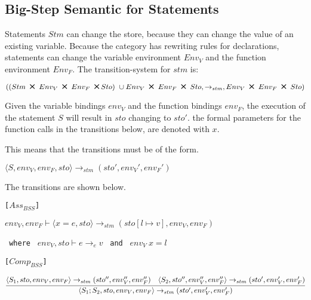 \subsection{Big-Step Semantic for Statements}
Statements $Stm$ can change the store, because they can change the value of an existing variable.
Because the category has rewriting rules for declarations, statements can change the variable environment $Env_V$ and the function environment $Env_F$.
The transition-system for $stm$ is:
\begin{center}
	$((Stm\ \Cross\ Env_V\ \Cross\ Env_F\ \Cross Sto)\ \cup Env_V\ \Cross\ Env_F\ \Cross\ Sto, \rightarrow_{stm}, Env_V\ \Cross\ Env_F\ \Cross\ Sto)$
\end{center}
Given the variable bindings $env_V$ and the function bindings $env_F$, the execution of the statement $S$ will 
result in $sto$ changing to $sto'$.
the formal parameters for the function calls in the transitions below, are denoted with $x$.

This means that the transitions must be of the form.

\begin{center}
	\begin{math}
		{\langle S, env_V, env_F, sto \rangle \rightarrow_{stm} (sto', env_V', env_F')}
	\end{math}
\end{center}

The transitions are shown below.

\texttt{[$Ass_{BSS}$]}
\begin{center}
	\begin{math}
		{env_V, env_F \vdash \langle x = e, sto \rangle \rightarrow_{stm} (sto[l \mapsto v], env_V, env_F)}
	\end{math}
	
	\texttt{ where } $env_V, sto \vdash e \rightarrow_e v$
	\texttt{ and } $env_V\ x = l$
\end{center}

\texttt{[$Comp_{BSS}$]}
\begin{center}
	\begin{math}
		\cfrac
			{\langle S_1, sto, env_V, env_F \rangle \rightarrow_{stm} (sto'', env_V'', env_F'') \quad \langle S_2, sto'', env_V'', env_F'' \rangle \rightarrow_{stm} (sto', env_V', env_F')}
			{\langle S_1; S_2, sto, env_V, env_F \rangle \rightarrow_{stm} (sto', env_V', env_F')}
	\end{math}
\end{center}

